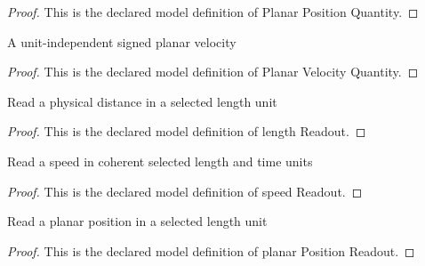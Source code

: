 \begin{proof}
  This is the declared model definition of Planar Position Quantity.
\end{proof}
\begin{definition}
  \label{def:physics:phyx-mini-0828:phyxminiproblems-problemphyxmini0828-planarvelocityquantity}
  A unit-independent signed planar velocity
\end{definition}
\begin{proof}
  This is the declared model definition of Planar Velocity Quantity.
\end{proof}
\begin{definition}
  \label{def:physics:phyx-mini-0828:phyxminiproblems-problemphyxmini0828-lengthreadout}
  Read a physical distance in a selected length unit
\end{definition}
\begin{proof}
  This is the declared model definition of length Readout.
\end{proof}
\begin{definition}
  \label{def:physics:phyx-mini-0828:phyxminiproblems-problemphyxmini0828-speedreadout}
  Read a speed in coherent selected length and time units
\end{definition}
\begin{proof}
  This is the declared model definition of speed Readout.
\end{proof}
\begin{definition}
  \label{def:physics:phyx-mini-0828:phyxminiproblems-problemphyxmini0828-planarpositionreadout}
  Read a planar position in a selected length unit
\end{definition}
\begin{proof}
  This is the declared model definition of planar Position Readout.
\end{proof}
